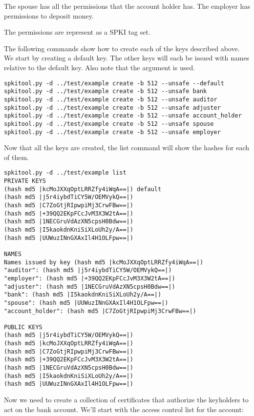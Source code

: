 \documentclass{howto}
\begin{document}
The spouse has all the permissions that the account holder has.
The employer has permissions to deposit money.

The permissions are represent as a SPKI tag set.

The following commands show how to create each of the keys described
above.  We start by creating a default key.  The other keys will each
be issued with names relative to the default key.  Also note that the
\programopt{-} argument is used.

\begin{verbatim}
spkitool.py -d ../test/example create -b 512 --unsafe --default
spkitool.py -d ../test/example create -b 512 --unsafe bank
spkitool.py -d ../test/example create -b 512 --unsafe auditor
spkitool.py -d ../test/example create -b 512 --unsafe adjuster
spkitool.py -d ../test/example create -b 512 --unsafe account_holder
spkitool.py -d ../test/example create -b 512 --unsafe spouse        
spkitool.py -d ../test/example create -b 512 --unsafe employer
\end{verbatim}

Now that all the keys are created, the list command will show the
hashes for each of them.

\begin{verbatim}
spkitool.py -d ../test/example list             
PRIVATE KEYS
(hash md5 |kcMoJXXqOptLRRZfy4iWqA==|) default
(hash md5 |j5r4iybdTiCY5W/OEMVykQ==|)
(hash md5 |C7ZoGtjRIpwpiMj3CrwFBw==|)
(hash md5 |+39QQ2EKpFCcJvM3X3W2tA==|)
(hash md5 |1NECGruVdAzXN5cpsH0Bdw==|)
(hash md5 |I5kaokdnKniSiXLoUh2y/A==|)
(hash md5 |UUWuzINnGXAxIl4H1OLFpw==|)

NAMES
Names issued by key (hash md5 |kcMoJXXqOptLRRZfy4iWqA==|)
"auditor": (hash md5 |j5r4iybdTiCY5W/OEMVykQ==|)
"employer": (hash md5 |+39QQ2EKpFCcJvM3X3W2tA==|)
"adjuster": (hash md5 |1NECGruVdAzXN5cpsH0Bdw==|)
"bank": (hash md5 |I5kaokdnKniSiXLoUh2y/A==|)
"spouse": (hash md5 |UUWuzINnGXAxIl4H1OLFpw==|)
"account_holder": (hash md5 |C7ZoGtjRIpwpiMj3CrwFBw==|)

PUBLIC KEYS
(hash md5 |j5r4iybdTiCY5W/OEMVykQ==|)
(hash md5 |kcMoJXXqOptLRRZfy4iWqA==|)
(hash md5 |C7ZoGtjRIpwpiMj3CrwFBw==|)
(hash md5 |+39QQ2EKpFCcJvM3X3W2tA==|)
(hash md5 |1NECGruVdAzXN5cpsH0Bdw==|)
(hash md5 |I5kaokdnKniSiXLoUh2y/A==|)
(hash md5 |UUWuzINnGXAxIl4H1OLFpw==|)
\end{verbatim}

Now we need to create a collection of certificates that authorize the
keyholders to act on the bank account.  We'll start with the access
control list for the account:
\end{document}
